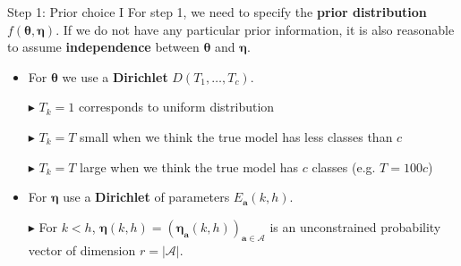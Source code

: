 \documentclass[aspectratio=169,xcolor=dvipsnames]{beamer}
\newcommand{\veca}{\boldsymbol{a}}
\newcommand{\seta}{\mathcal{A}}
\newcommand{\veceta}{\boldsymbol{\eta}}
\newcommand{\vectheta}{\boldsymbol{\theta}}
\begin{document}
\begin{frame}{Step 1: Prior choice I}
For step 1, we need to specify the \textbf{prior distribution} $f(\vectheta, \veceta)$. If we do not have any particular prior information, it is also reasonable to assume \textbf{independence} between $\vectheta$ and $\veceta$.
\pause 
\vspace{5pt}
\begin{itemize}
    \item For $\vectheta$ we use a \textbf{Dirichlet} $D(T_1,\dots, T_c)$.
        \addtolength{\itemindent}{12pt}
        \pause
        \item[$\blacktriangleright$] $T_k = 1$ corresponds to uniform distribution
        \pause
        \item[$\blacktriangleright$]  $T_k =T$ small when we think the true model has less classes than $c$
        \pause
        \item[$\blacktriangleright$]  $T_k=T$ large when we think the true model has $c$ classes (e.g. $T=100c$)
        \addtolength{\itemindent}{-12pt}
\vspace{10pt}
    \pause
    \item For $\veceta$ use a \textbf{Dirichlet} of parameters $E_{\veca}(k,h)$.
        \addtolength{\itemindent}{12pt}
        \pause
        \item[$\blacktriangleright$] For $k<h$, $\veceta(k,h)=(\veceta_{\veca}(k,h))_{\veca \in \seta}$ is an unconstrained probability vector of dimension $r=|\seta|$.
\end{itemize}
\end{frame}
\end{document}

